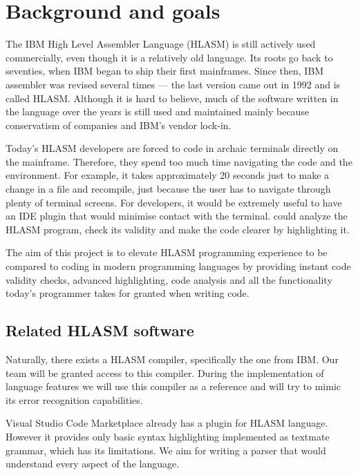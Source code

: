 \chapter{Background and goals}


The IBM High Level Assembler Language (HLASM) is still actively used commercially, even though it is a relatively old language. Its roots go back to seventies, when IBM began to ship their first mainframes. Since then, IBM assembler was revised several times --- the last version came out in 1992 and is called HLASM. Although it is hard to believe, much of the software written in the language over the years is still used and maintained mainly because conservatism of companies and IBM's vendor lock-in.

Today's HLASM developers are forced to code in archaic terminals directly on the mainframe. Therefore, they spend too much time navigating the code and the environment. For example, it takes approximately 20 seconds just to make a change in a file and recompile, just because the user has to navigate through plenty of terminal screens. For developers, it would be extremely useful to have an IDE plugin that would minimise contact with the terminal. could analyze the HLASM program, check its validity and make the code clearer by highlighting it. 

The aim of this project is to elevate HLASM programming experience to be compared to coding in modern programming languages by providing instant code validity checks, advanced highlighting, code analysis and all the functionality today's programmer takes for granted when writing code.

\section{Related HLASM software}
Naturally, there exists a HLASM compiler, specifically the one from IBM. Our team will be granted access to this compiler. During the implementation of language features we will use this compiler as a reference and will try to mimic its error recognition capabilities.

Visual Studio Code Marketplace already has a plugin for HLASM language. However it provides only basic syntax highlighting implemented as textmate grammar, which has its limitations. We aim for writing a parser that would understand every aspect of the language.